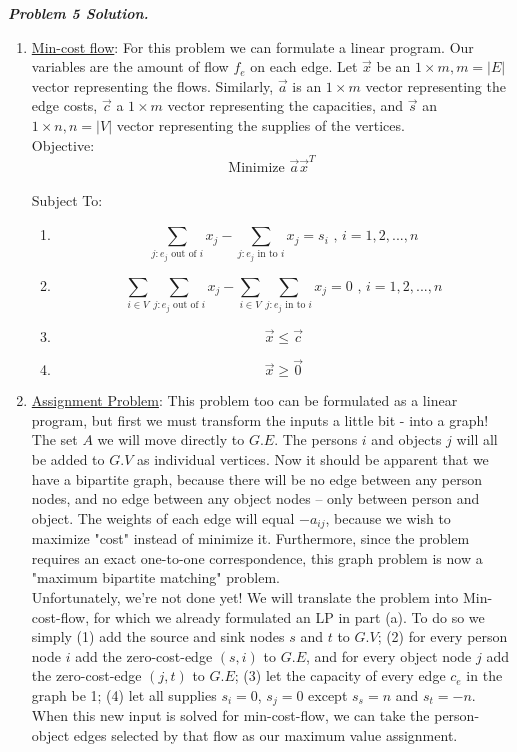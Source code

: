 \documentclass[10pt, letterpaper, twosided]{article}
\begin{document}
\emph{\textbf{Problem 5 Solution.}}
\begin{enumerate}[label=(\alph*)]
\item \underline{Min-cost flow}: For this problem we can formulate a linear program.  Our variables are the amount of flow 
$f_e$ on each edge.  Let $\vec{x}$ be an $1 \times m, m=|E|$ vector representing the flows.  Similarly, $\vec{a}$ is an 
$1 \times m$ vector representing the edge costs, $\vec{c}$ a $1 \times m$ vector representing the capacities, and
$\vec{s}$ an $1 \times n, n=|V|$ vector representing the supplies of the vertices.\\

Objective: $$\text{Minimize } \vec{a}\vec{x}^T$$\\

Subject To:\\
\begin{enumerate}[label=(\roman*)]
\item $$\sum\limits_{j: e_j \text{ out of } i}x_j  - \sum\limits_{j: e_j \text{ in to } i}x_j = s_i \text{  ,  } i = 1,2,...,n$$
\item $$\sum\limits_{i \in V}\sum\limits_{j : e_j\text{ out of } i}x_j  -  \sum\limits_{i \in V}\sum\limits_{j : e_j\text{ in to } i}x_j = 0\text{  ,  } i = 1,2,...,n$$
\item $$\vec{x} \leq \vec{c}$$
\item $$\vec{x} \geq \vec{0}$$
\end{enumerate}

\item \underline{Assignment Problem}:  This problem too can be formulated as a linear program, but first we must transform
the inputs a little bit - into a graph!  The set $A$ we will move directly to $G.E$.  The persons $i$ and objects $j$ will all be
added to $G.V$ as individual vertices.  Now it should be apparent that we have a bipartite graph, because there will be no
edge between any person nodes, and no edge between any object nodes -- only between person and object.  The weights of each edge will equal $-a_{ij}$, because we wish to maximize "cost" instead of minimize it. Furthermore, since the problem requires an exact one-to-one correspondence, this graph problem is now a "maximum bipartite matching" problem.\\

Unfortunately, we're not done yet!  We will translate the problem into Min-cost-flow, for which we already formulated an LP
in part (a).  To do so we simply (1) add the source and sink nodes $s$ and $t$ to $G.V$; (2) for every person node $i$ add the zero-cost-edge $(s,i)$ to $G.E$, and for every object node $j$ add the zero-cost-edge $(j,t)$ to $G.E$; (3) let the capacity of every edge $c_e$ in the graph be 1; (4) let all supplies $s_i=0$, $s_j=0$ except $s_s=n$ and $s_t=-n$.
When this new input is solved for min-cost-flow, we can take the person-object edges selected by that flow as our maximum value assignment. \\


\end{enumerate}
\end{document}
